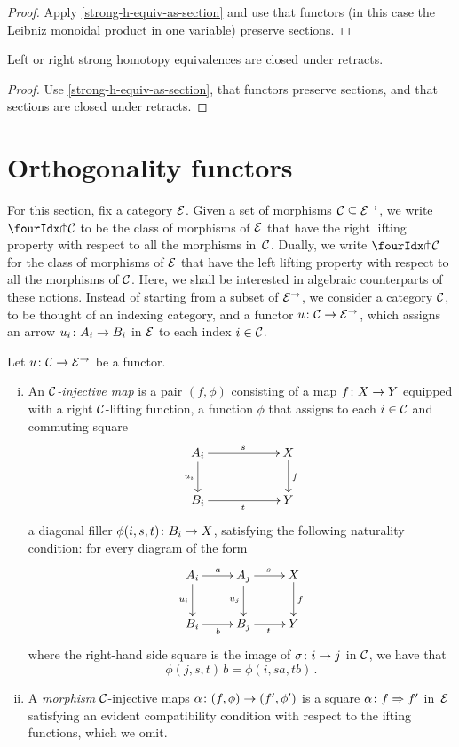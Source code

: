 \documentclass[reqno,10pt,a4paper,oneside]{amsart}
\begin{document}
\begin{proof}
Apply \cref{strong-h-equiv-as-section} and use that functors (in this case the Leibniz monoidal product in one variable) preserve sections.
\end{proof}

\begin{proposition}
\label{strong-h-equiv-closed-under-retract}
Left or right strong homotopy equivalences are closed under retracts.
\end{proposition}

\begin{proof}
Use \cref{strong-h-equiv-as-section},  that functors preserve sections, and that  sections are closed under retracts.
\end{proof}



\section{Orthogonality functors}
\label{sec:ortf}

For this section, fix a category $\catE$. Given a set of morphisms $\cal{C} \subseteq \catE^\to$, we 
write $\liftr{\cal{C}}$ to be the class of morphisms of $\catE$ that have 
the right lifting property with respect to all the morphisms in~$\cal{C}$. Dually, we write $\liftl{\cal{C}}$ for the class of morphisms of $\catE$ that have the left lifting property with respect to all the morphisms of $\cal{C}$. 
Here, we shall be interested in algebraic counterparts of these notions. Instead of starting from a subset of $\catE^\to$, we consider a category $\cal{C}$, to be thought of an indexing category, and a functor $u \co \cal{C} \to \catE^\to$, which assigns an arrow $u_i \co A_i \to B_i$ in $\catE$ to each index $i \in \cal{C}$.


 \begin{definition} Let $u \co \cal{C} \to \catE^\to$ be a functor. 
 \begin{enumerate}[(i)] 
 \item  An \emph{$\cal{C}$-injective map}
 is a pair $(f, \phi)$ consisting of a map $f \co X \to Y$ equipped with a right  $\cal{C}$-lifting function, \ie 
 a function  $\phi$ that assigns to each $i \in \cal{C}$ and commuting square
\[
\xymatrix@C=2cm{
A_i \ar[r]^{s}   \ar[d]_{u_i} & X \ar[d]^f \\
B_i \ar[r]_{t} & Y}
\]
a diagonal filler $\phi(i,s, t) \co B_i \to X$, satisfying the following naturality 
condition: for every diagram of the form
\[
\xymatrix{
A_i \ar[r]^a \ar[d]_{u_i} & A_j \ar[r]^{s}  \ar[d]_{u_j} & X \ar[d]^f   \\
B_i \ar[r]_{b}  & B_j  \ar[r]_{t}  & Y }
\]
where the right-hand side square is the image of $\sigma \co i \to j$ in $\cal{C}$, 
we have that 
\[
\phi(j, s, t) \, b = \phi(i, s  a, t  b) \, .
\]
\item A \emph{morphism} $\cal{C}$-injective maps $\alpha \co (f, \phi) \to (f', \phi')$ is a 
square $\alpha \co f \Rightarrow f'$ in~$\catE$ satisfying an evident compatibility condition 
with respect to the ifting functions, which we omit. 
\end{enumerate}
\end{definition}
\end{document}
